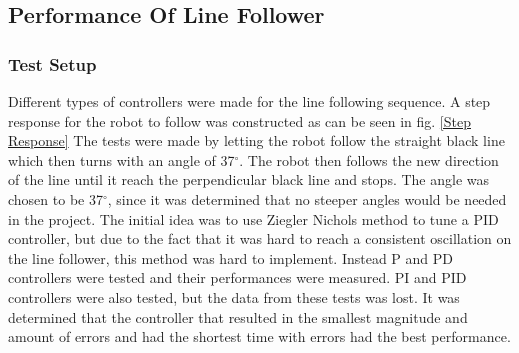 \subsection{Performance Of Line Follower}

\subsubsection{Test Setup}
Different types of controllers were made for the line following sequence.  A step response for the robot to follow was constructed as can be seen in fig. \ref{Step Response} The tests were made by letting the robot follow the straight black line which then turns with an angle of 37$^{\circ}$. The robot then follows the new direction of the line until it reach the perpendicular black line and stops. The angle was chosen to be 37$^{\circ}$, since it was determined that no steeper angles would be needed in the project. The initial idea was to use Ziegler Nichols method to tune a PID controller, but due to the fact that it was hard to reach a consistent oscillation on the line follower, this method was hard to implement. Instead P and PD controllers were tested and their performances were measured. PI and PID controllers were also tested, but the data from these tests was lost. It was determined that the controller that resulted in the smallest magnitude and amount of errors and had the shortest time with errors had the best performance.


